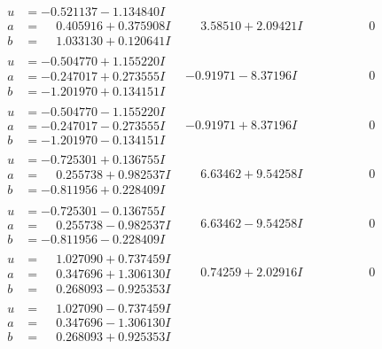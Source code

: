 \documentclass[1p]{elsarticle_modified}
\theoremstyle{definition}
\begin{document}
$$\begin{array}{c|c|c}
\begin{aligned}
u &= -0.521137 - 1.134840 I \\
a &= \phantom{-}0.405916 + 0.375908 I \\
b &= \phantom{-}1.033130 + 0.120641 I\end{aligned}
 & \phantom{-}3.58510 + 2.09421 I & \phantom{-0.000000 } 0 \\ \hline\begin{aligned}
u &= -0.504770 + 1.155220 I \\
a &= -0.247017 + 0.273555 I \\
b &= -1.201970 + 0.134151 I\end{aligned}
 & -0.91971 - 8.37196 I & \phantom{-0.000000 } 0 \\ \hline\begin{aligned}
u &= -0.504770 - 1.155220 I \\
a &= -0.247017 - 0.273555 I \\
b &= -1.201970 - 0.134151 I\end{aligned}
 & -0.91971 + 8.37196 I & \phantom{-0.000000 } 0 \\ \hline\begin{aligned}
u &= -0.725301 + 0.136755 I \\
a &= \phantom{-}0.255738 + 0.982537 I \\
b &= -0.811956 + 0.228409 I\end{aligned}
 & \phantom{-}6.63462 + 9.54258 I & \phantom{-0.000000 } 0 \\ \hline\begin{aligned}
u &= -0.725301 - 0.136755 I \\
a &= \phantom{-}0.255738 - 0.982537 I \\
b &= -0.811956 - 0.228409 I\end{aligned}
 & \phantom{-}6.63462 - 9.54258 I & \phantom{-0.000000 } 0 \\ \hline\begin{aligned}
u &= \phantom{-}1.027090 + 0.737459 I \\
a &= \phantom{-}0.347696 + 1.306130 I \\
b &= \phantom{-}0.268093 - 0.925353 I\end{aligned}
 & \phantom{-}0.74259 + 2.02916 I & \phantom{-0.000000 } 0 \\ \hline\begin{aligned}
u &= \phantom{-}1.027090 - 0.737459 I \\
a &= \phantom{-}0.347696 - 1.306130 I \\
b &= \phantom{-}0.268093 + 0.925353 I\end{aligned}

\end{array}$$
\end{document}
